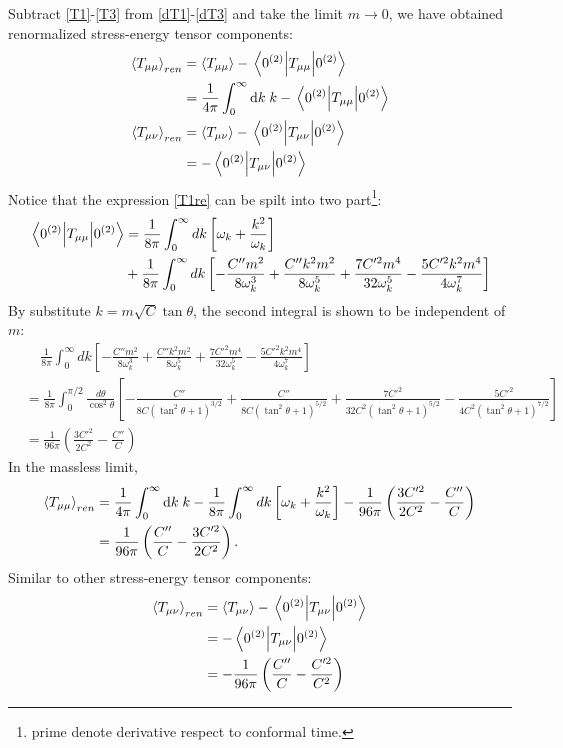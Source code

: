 \documentclass[12pt]{article}
\numberwithin{equation}{section}
\theoremstyle{1style}
\newcommand{\id}{\mathrm{d}}
\begin{document}
Subtract \ref{T1}-\ref{T3} from \ref{dT1}-\ref{dT3} and take the limit \(m\rightarrow 0\), we have obtained renormalized stress-energy tensor components:
\begin{align}
    \expval{T_{\mu\mu}}_{ren}&= \expval{T_{\mu\mu}}-\expval{T_{\mu\mu}}{0^{(2)}}\\
    &=\frac{1}{4\pi}\int_0^\infty \id k\; k-\expval{T_{\mu\mu}}{0^{(2)}}\label{T1re}\\
    \expval{T_{\mu\nu}}_{ren}&= \expval{T_{\mu\nu}}-\expval{T_{\mu\nu}}{0^{(2)}}\\
    &=-\expval{T_{\mu\nu}}{0^{(2)}}
\end{align}
Notice that the expression \ref{T1re} can be spilt into two part\footnote{prime denote derivative respect to conformal time.}:
\begin{align}
    \expval{T_{\mu\mu}}{0^{(2)}}&=\frac{1}{8\pi}\int_{0}^{\infty}dk\left[\omega_k+\frac{k^2}{\omega_k}\right]\\
    &+\frac{1}{8\pi}\int_{0}^{\infty}dk\left[-\frac{C''m^2}{8\omega_k^3}+\frac{C''k^2m^2}{8\omega_k^5}+\frac{7C'^2m^4}{32\omega^5_k}-\frac{5C'^2k^2m^4}{4\omega_k^7}\right]
\end{align}
By substitute \(k=m\sqrt{C}\tan\theta\), the second integral is shown to be independent of \(m\):
\begin{align}
    &~~~~~\frac{1}{8\pi}\int_{0}^{\infty}dk\left[-\frac{C''m^2}{8\omega_k^3}+\frac{C''k^2m^2}{8\omega_k^5}+\frac{7C'^2m^4}{32\omega^5_k}-\frac{5C'^2k^2m^4}{4\omega_k^7}\right]\\
    &=\frac{1}{8\pi}\int_{0}^{\pi/2}\frac{d\theta}{\cos^2\theta}\left[-\frac{C''}{8C(\tan^2\theta+1)^{3/2}}+\frac{C''}{8C(\tan^2\theta+1)^{5/2}}+\frac{7C'^2}{32C^2(\tan^2\theta+1)^{5/2}}-\frac{5C'^2}{4C^2(\tan^2\theta+1)^{7/2}}\right]\\
    &=\frac{1}{96\pi}\left(\frac{3C'^2}{2C^2}-\frac{C''}{C}\right)
\end{align}
In the massless limit,
\begin{align}
  \expval{T_{\mu\mu}}_{ren}&=\frac{1}{4\pi}\int_0^\infty \id k\; k- \frac{1}{8\pi}\int_{0}^{\infty}dk\left[\omega_k+\frac{k^2}{\omega_k}\right]-\frac{1}{96\pi}\left(\frac{3C'^2}{2C^2}-\frac{C''}{C}\right)\\
  &=\frac{1}{96\pi}\left(\frac{C''}{C}-\frac{3C'^2}{2C^2}\right).
\end{align}
Similar to other stress-energy tensor components:
\begin{align}
    \expval{T_{\mu\nu}}_{ren}&= \expval{T_{\mu\nu}}-\expval{T_{\mu\nu}}{0^{(2)}}\\
    &=-\expval{T_{\mu\nu}}{0^{(2)}}\\
    &=-\frac{1}{96\pi}\left(\frac{C''}{C}-\frac{C'^2}{C^2}\right)
\end{align}
\end{document}
